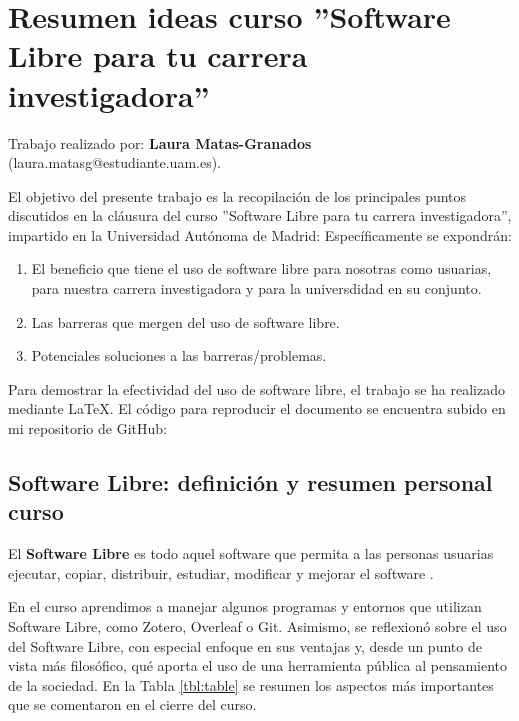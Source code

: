 \documentclass[12pt,a4paper]{article}
\begin{document}
\section*{\centering Resumen ideas curso ''Software Libre para tu carrera investigadora''}

Trabajo realizado por: \textbf{Laura Matas-Granados} (laura.matasg@estudiante.uam.es).

\hspace{10mm}

El objetivo del presente trabajo es la recopilación de los principales puntos discutidos en la cláusura del curso ''Software Libre para tu carrera investigadora'', impartido en la Universidad Autónoma de Madrid: Específicamente se expondrán:

\begin{enumerate}
  \item El beneficio que tiene el uso de software libre para nosotras como usuarias, para nuestra carrera investigadora y para la universdidad en su conjunto.
  \item Las barreras que mergen del uso de software libre.
  \item Potenciales soluciones a las barreras/problemas.
\end{enumerate}
Para demostrar la efectividad del uso de software libre, el trabajo se ha realizado mediante LaTeX. El código para reproducir el documento se encuentra subido en mi repositorio de GitHub: 

\subsection*{Software Libre: definición y resumen personal curso}

El \textbf{Software Libre} es todo aquel software que permita a las personas usuarias ejecutar, copiar, distribuir, estudiar, modificar y mejorar el software \parencite{free_software_foundation_what_nodate}.

\hspace{10mm}

En el curso aprendimos a manejar algunos programas y entornos que utilizan Software Libre, como Zotero, Overleaf o Git. Asimismo, se reflexionó sobre el uso del Software Libre, con especial enfoque en sus ventajas y, desde un punto de vista más filosófico, qué aporta el uso de una herramienta pública al pensamiento de la sociedad. En la Tabla \ref{tbl:table} se resumen los aspectos más importantes que se comentaron en el cierre del curso. 
\end{document}
